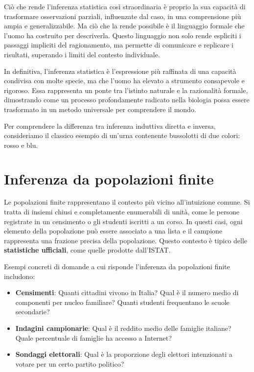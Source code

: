 \documentclass[
  11pt,
]{book}
\providecommand{\tightlist}{%
  \setlength{\itemsep}{0pt}\setlength{\parskip}{0pt}}
\theoremstyle{mytheoremstyle}
\theoremstyle{mydefstyle}
\begin{document}
Ciò che rende l'inferenza statistica così straordinaria è proprio la sua capacità di trasformare osservazioni parziali, influenzate dal caso, in una comprensione più ampia e generalizzabile. Ma ciò che la rende possibile è il linguaggio formale che l'uomo ha costruito per descriverla. Questo linguaggio non solo rende espliciti i passaggi impliciti del ragionamento, ma permette di comunicare e replicare i risultati, superando i limiti del contesto individuale.

In definitiva, l'inferenza statistica è l'espressione più raffinata di una capacità condivisa con molte specie, ma che l'uomo ha elevato a strumento consapevole e rigoroso. Essa rappresenta un ponte tra l'istinto naturale e la razionalità formale, dimostrando come un processo profondamente radicato nella biologia possa essere trasformato in un metodo universale per comprendere il mondo.

Per comprendere la differenza tra inferenza induttiva diretta e inversa, consideriamo il classico esempio di un'urna contenente bussolotti di due colori: rosso e blu.

\section{Inferenza da popolazioni finite}\label{inferenza-da-popolazioni-finite}

Le popolazioni finite rappresentano il contesto più vicino all'intuizione comune. Si tratta di insiemi chiusi e completamente enumerabili di unità, come le persone registrate in un censimento o gli studenti iscritti a un corso. In questi casi, ogni elemento della popolazione può essere associato a una lista e il campione rappresenta una frazione precisa della popolazione. Questo contesto è tipico delle \textbf{statistiche ufficiali}, come quelle prodotte dall'ISTAT.

Esempi concreti di domande a cui risponde l'inferenza da popolazioni finite includono:

\begin{itemize}
\tightlist
\item
  \textbf{Censimenti}: Quanti cittadini vivono in Italia? Qual è il numero medio di componenti per nucleo familiare? Quanti studenti frequentano le scuole secondarie?
\item
  \textbf{Indagini campionarie}: Qual è il reddito medio delle famiglie italiane? Quale percentuale di famiglie ha accesso a Internet?
\item
  \textbf{Sondaggi elettorali}: Qual è la proporzione degli elettori intenzionati a votare per un certo partito politico?
\end{itemize}
\end{document}

